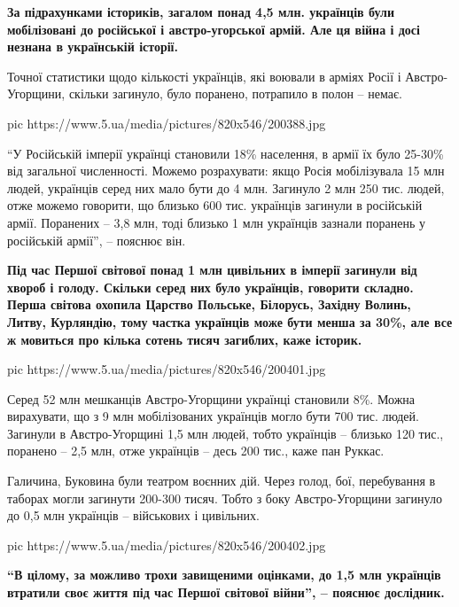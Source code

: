 \begin{leftbar}
	\bfseries
За підрахунками істориків, загалом понад 4,5 млн. українців були
мобілізовані до російської і австро-угорської армій. Але ця війна і досі
незнана в українській історії.
\end{leftbar}

Точної статистики щодо кількості українців, які воювали в арміях Росії і
Австро-Угорщини, скільки загинуло, було поранено, потрапило в полон –
немає.

\ifcmt
pic https://www.5.ua/media/pictures/820x546/200388.jpg
\fi

\enquote{У Російській імперії українці становили 18\% населення, в армії їх було
25-30\% від загальної численності. Можемо розрахувати: якщо Росія
мобілізувала 15 млн людей, українців серед них мало бути до 4 млн.
Загинуло 2 млн 250 тис. людей, отже можемо говорити, що близько 600 тис.
українців загинули в російській армії. Поранених – 3,8 млн, тоді близько 1
млн українців зазнали поранень у російській армії}, – пояснює він.

\begin{leftbar}
	\bfseries
Під час Першої світової понад 1 млн цивільних в імперії загинули від
хвороб і голоду. Скільки серед них було українців, говорити складно.
Перша світова охопила Царство Польське, Білорусь, Західну Волинь, Литву,
Курляндію, тому частка українців може бути менша за 30\%, але все ж
мовиться про кілька сотень тисяч загиблих, каже історик.
\end{leftbar}

\ifcmt
pic https://www.5.ua/media/pictures/820x546/200401.jpg
\fi

Серед 52 млн мешканців Австро-Угорщини українці становили 8\%. Можна
вирахувати, що з 9 млн мобілізованих українців могло бути 700 тис. людей.
Загинули в Австро-Угорщині 1,5 млн людей, тобто українців – близько 120
тис., поранено – 2,5 млн, отже українців – десь 200 тис., каже пан Руккас.

Галичина, Буковина були театром воєнних дій. Через голод, бої, перебування
в таборах могли загинути 200-300 тисяч. Тобто з боку Австро-Угорщини
загинуло до 0,5 млн українців – військових і цивільних.

\ifcmt
pic https://www.5.ua/media/pictures/820x546/200402.jpg
\fi

\begin{leftbar}
	\bfseries
\enquote{В цілому, за можливо трохи завищеними оцінками, до 1,5 млн українців
втратили своє життя під час Першої світової війни}, – пояснює дослідник.
\end{leftbar}

